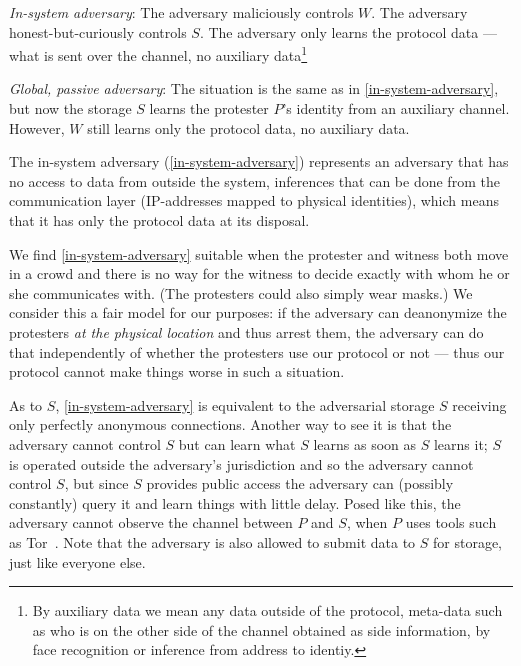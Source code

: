 \begin{adversaries}
\item\label{in-system-adversary}
  \emph{In-system adversary}:
  The adversary maliciously controls \(W\).
  The adversary honest-but-curiously controls \(S\).
  The adversary only learns the protocol data --- \ie what is sent over the 
  channel, no auxiliary data\footnote{%
    By auxiliary data we mean any data outside of the protocol, \ie
    meta-data such as who is on the other side of the channel obtained
    as side information, \eg by face recognition or inference from address
    to identiy.
  }

\item\label{deanonymizing-storage-adversary}
  \emph{Global, passive adversary}:
  The situation is the same as in \cref{in-system-adversary}, but now the storage 
  \(S\) learns the protester \(P\)'s identity from an auxiliary channel.
  However, \(W\) still learns only the protocol data, no auxiliary data.

\end{adversaries}

The in-system adversary (\cref{in-system-adversary}) represents an adversary 
that has no access to data from outside the system, \eg inferences that can be 
done from the communication layer (\eg IP-addresses mapped to physical 
identities), which means that it has only the protocol data at its disposal.

We find \cref{in-system-adversary} suitable when the protester and witness both 
move in a crowd and there is no way for the witness to decide exactly with whom 
he or she communicates with.
(The protesters could also simply wear masks.)
We consider this a fair model for our purposes: if the adversary can 
deanonymize the protesters \emph{at the physical location} and thus arrest 
them, the adversary can do that independently of whether the protesters use our 
protocol or not --- thus our protocol cannot make things worse in such a 
situation.

As to \(S\), \cref{in-system-adversary} is equivalent to the adversarial 
storage \(S\) receiving only perfectly anonymous connections.
Another way to see it is that the adversary cannot control \(S\) but can learn 
what \(S\) learns as soon as \(S\) learns it; \eg \(S\) is operated outside the 
adversary's jurisdiction and so the adversary cannot control \(S\), but since 
\(S\) provides public access the adversary can (possibly constantly) query it 
and learn things with little delay.
Posed like this, the adversary cannot observe the channel between \(P\) and 
\(S\), \eg when \(P\) uses tools such as Tor~\cite{Tor}.
Note that the adversary is also allowed to submit data to \(S\) for storage, 
just like everyone else.

